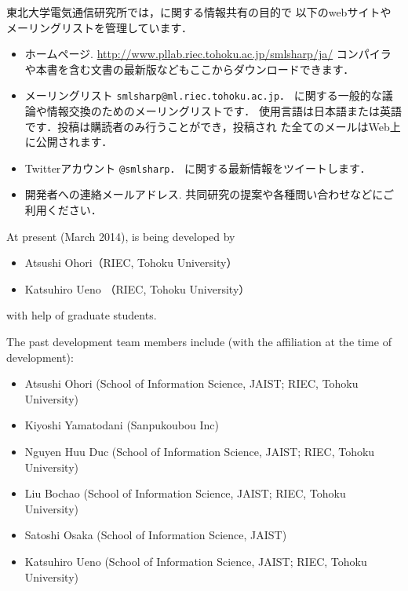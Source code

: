 	東北大学電気通信研究所では，\smlsharp{}に関する情報共有の目的で
以下のwebサイトやメーリングリストを管理しています．
\begin{itemize}
\item \smlsharp{}ホームページ.
\url{http://www.pllab.riec.tohoku.ac.jp/smlsharp/ja/}
コンパイラや本書を含む文書の最新版などもここからダウンロードできます．

\item \smlsharp{}メーリングリスト
{\tt smlsharp@ml.riec.tohoku.ac.jp}．
\smlsharp{}に関する一般的な議論や情報交換のためのメーリングリストです．
使用言語は日本語または英語です．投稿は購読者のみ行うことができ，投稿され
た全てのメールはWeb上に公開されます．\\

\item Twitterアカウント {\tt @smlsharp}．
\smlsharp{}に関する最新情報をツイートします．

\item \smlsharp{}開発者への連絡メールアドレス.
共同研究の提案や各種問い合わせなどにご利用ください．
\end{itemize}
\else%
	At present (March 2014), \smlsharp{} is being developed by
\begin{itemize}
\item 
Atsushi Ohori（RIEC, Tohoku University）
\item 
Katsuhiro Ueno （RIEC, Tohoku University）
\end{itemize}
with help of graduate students.

	The past \smlsharp{} development team members include (with the
affiliation at the time of development):
\begin{itemize}
\item Atsushi Ohori (School of Information Science, JAIST; RIEC, Tohoku University)
\item Kiyoshi Yamatodani (Sanpukoubou Inc)
\item Nguyen Huu Duc (School of Information Science, JAIST; RIEC, Tohoku University)
\item Liu Bochao (School of Information Science, JAIST; RIEC, Tohoku University)
\item Satoshi Osaka (School of Information Science, JAIST)
\item Katsuhiro Ueno (School of Information Science, JAIST; RIEC, Tohoku University)
\end{itemize}

